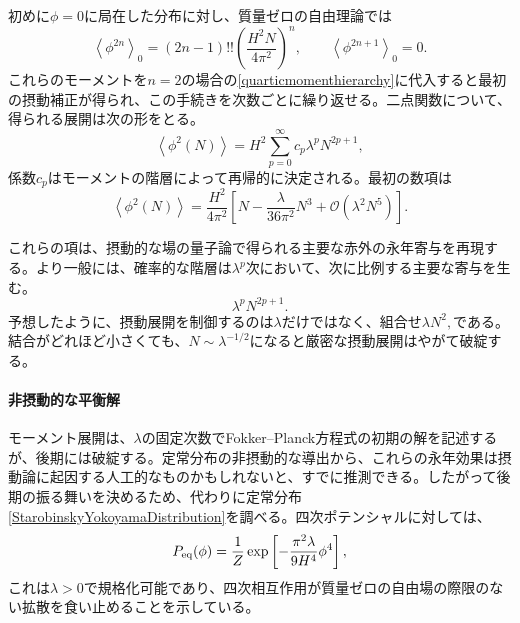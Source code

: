\documentclass[a4paper,11pt,oneside]{article}
\theoremstyle{definition}
\numberwithin{equation}{section}
\begin{document}
初めに\(\phi=0\)に局在した分布に対し、質量ゼロの自由理論では
\begin{equation}
\left\langle
\phi^{2n}
\right\rangle_{0}
=
(2n-1)!!
\left(
\frac{H^{2}N}{4\pi^{2}}
\right)^{n},
\qquad
\left\langle
\phi^{2n+1}
\right\rangle_{0}
=
0.
\end{equation}
これらのモーメントを$ n=2$の場合の\eqref{quarticmomenthierarchy}に代入すると最初の摂動補正が得られ、この手続きを次数ごとに繰り返せる。二点関数について、得られる展開は次の形をとる。
\begin{equation}
\left\langle
\phi^{2}(N)
\right\rangle
=
H^{2}
\sum_{p=0}^{\infty}
c_{p}\lambda^{p}N^{2p+1},
\label{quarticperturbativeseries}
\end{equation}
係数\(c_{p}\)はモーメントの階層によって再帰的に決定される。最初の数項は
\begin{equation}
\left\langle
\phi^{2}(N)
\right\rangle
=
\frac{H^{2}}{4\pi^{2}}
\left[
N
-
\frac{\lambda}{36\pi^{2}}N^{3}
+
\mathcal O\left(
\lambda^{2}N^{5}
\right)
\right].
\label{quarticfirstsecularterms}
\end{equation}


これらの項は、摂動的な場の量子論で得られる主要な赤外の永年寄与を再現する。より一般には、確率的な階層は\(\lambda^{p}\)次において、次に比例する主要な寄与を生む。
\begin{equation}
\lambda^{p}N^{2p+1}.
\end{equation}
予想したように、摂動展開を制御するのは\(\lambda\)だけではなく、組合せ\(
\lambda N^{2},
\)である。結合がどれほど小さくても、\(
N
\sim \lambda^{-1/2}
\)になると厳密な摂動展開はやがて破綻する。





\paragraph{非摂動的な平衡解}



モーメント展開は、\(\lambda\)の固定次数でFokker--Planck方程式の初期の解を記述するが、後期には破綻する。定常分布の非摂動的な導出から、これらの永年効果は摂動論に起因する人工的なものかもしれないと、すでに推測できる。したがって後期の振る舞いを決めるため、代わりに定常分布\eqref{StarobinskyYokoyamaDistribution}を調べる。四次ポテンシャルに対しては、
\begin{equation}
P_{\rm eq}(\phi)
=
\frac{1}{Z}
\exp\left[
-
\frac{\pi^{2}\lambda}{9H^{4}}
\phi^{4}
\right],
\label{quarticequilibriumdistribution}
\end{equation}
これは\(\lambda>0\)で規格化可能であり、四次相互作用が質量ゼロの自由場の際限のない拡散を食い止めることを示している。
\end{document}
